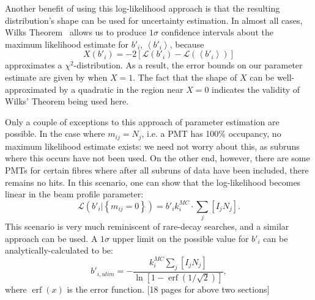 Another benefit of using this log-likelihood approach is that the resulting distribution's shape can be used for uncertainty estimation. In almost all cases, Wilks Theorem~\cite{wilksLargeSampleDistributionLikelihood1938} allows us to produce $1 \sigma$ confidence intervals about the maximum likelihood estimate for $b'_{i}$, $\left<b'_{i}\right>$, because $$X(b'_{i}) = -2\left[\mathcal{L}\left(b'_{i}\right) - \mathcal{L}\left(\left<b'_{i}\right>\right)\right]$$ approximates a $\chi^2$-distribution. As a result, the error bounds on our parameter estimate are given by when $X = 1$. The fact that the shape of $X$ can be well-approximated by a quadratic in the region near $X = 0$ indicates the validity of Wilks' Theorem being used here.

Only a couple of exceptions to this approach of parameter estimation are possible. In the case where $m_{ij} = N_{j}$, i.e. a PMT has 100\% occupancy, no maximum likelihood estimate exists: we need not worry about this, as subruns where this occurs have not been used. On the other end, however, there are some PMTs for certain fibres where after all subruns of data have been included, there remains no hits. In this scenario, one can show that the log-likelihood becomes linear in the beam profile parameter:
\begin{equation}
    \mathcal{L}\left(b'_{i}|\left\{m_{ij}=0\right\}\right) = b'_{i}k_{i}^{MC}\cdot\sum_{j}\left[I_{j}N_{j}\right].
\end{equation}
This scenario is very much reminiscent of rare-decay searches, and a similar approach can be used. A $1 \sigma$ upper limit on the possible value for $b'_{i}$ can be analytically-calculated to be:
\begin{equation}
    b'_{i,ulim} = -\frac{k_{i}^{MC}\sum_{j}\left[I_{j}N_{j}\right]}{\ln\left[1 - \operatorname{erf}\left(1/\sqrt{2}\right)\right]},
\end{equation}
where $\operatorname{erf}(x)$ is the error function.
{
    \color{blue}
    [18 pages for above two sections]
}

